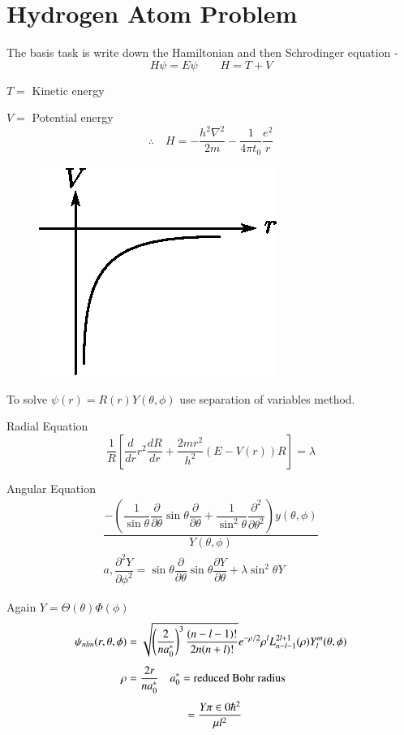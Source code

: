 \section*{Hydrogen Atom Problem}

The basis task is write down the Hamiltonian and then Schrodinger equation -
$$
H\psi = E\psi\qquad H = T+V
$$

$T=$ Kinetic energy

$V=$ Potential energy
$$
\therefore\quad H = -\dfrac{h^{2}\nabla^{2}}{2m}-\frac{1}{4\pi t_{0}}\dfrac{e^{2}}{r}
$$

\begin{figure}[H]
\centering
\includegraphics[scale=1.1]{images/lecture1/fig2.eps}
\end{figure}


To solve $\psi(r)=R(r)Y(\theta,\phi)$ use separation of variables method.

\smallskip

Radial Equation
$$
\dfrac{1}{R}\left[\dfrac{d}{dr}r^{2}\dfrac{dR}{dr}+\dfrac{2mr^{2}}{h^{2}}(E-V(r))R\right]=\lambda
$$

Angular Equation
\begin{gather*}
\dfrac{-\left(\dfrac{1}{\sin\theta}\dfrac{\partial}{\partial\theta}\sin\theta\dfrac{\partial}{\partial\theta}+\dfrac{1}{\sin^{2}\theta}\dfrac{\partial^{2}}{\partial\theta^{2}}\right)y(\theta,\phi)}{Y(\theta,\phi)}\\
a, \dfrac{\partial^{2}Y}{\partial \phi^{2}}=\sin\theta\dfrac{\partial}{\partial\theta}\sin\theta\dfrac{\partial Y}{\partial\theta}+\lambda\sin^{2}\theta Y
\end{gather*}

Again $Y=\Theta(\theta)\Phi (\phi)$
\begin{align*}
\psi_{nlm}(r,\theta,\phi) &= \sqrt{\left(\dfrac{2}{na^{*}_{0}}\right)^{3}\dfrac{(n-l-1)!}{2n(n+l)!}}e^{-\rho/2}\rho^{l}L^{2l+1}_{n-l-1}(\rho)Y^{m}_{l}(\theta,\phi)\\[4pt]
\rho &= \dfrac{2r}{na^{*}_{0}}\quad a^{*}_{0} = \text{reduced Bohr radius}\\[3pt]
&\hspace{1.8cm} = \dfrac{Y\pi\in 0 \hbar^{2}}{\mu l^{2}}
\end{align*}

